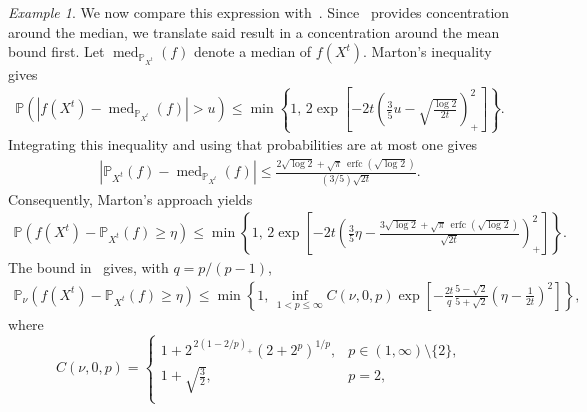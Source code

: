 \documentclass[11pt]{article}
\theoremstyle{plain}
\theoremstyle{remark}
\newtheorem{example}{Example}
\begin{document}
\begin{example}
We now compare this expression with~\cite{dependentViaMartingale, dependentViaStatAndChange, Marton1996BoundingB}. Since~\cite{Marton1996BoundingB} provides concentration around the median, we translate said result in a concentration around the mean bound first. 
Let
\(\operatorname{med}_{\mathbb P_{X^t}}(f)\) denote a median of
\(f(X^t)\). Marton's inequality gives
\begin{align}
\mathbb P\left(
    \left|
        f(X^t)
        -
        \operatorname{med}_{\mathbb P_{X^t}}(f)
    \right|>u
\right) \leq
\min\left\{
    1,\,
    2\exp\left[
        -2t\left(
            \frac35u-\sqrt{\frac{\log 2}{2t}}
        \right)_+^2
    \right]
\right\}.
\label{eq:nonStationaryTimeDependentMartonMedian}
\end{align}
Integrating this inequality and using that probabilities are at most
one gives
\begin{align}
\left|
    \mathbb P_{X^t}(f)
    -
    \operatorname{med}_{\mathbb P_{X^t}}(f)
\right|
\leq
\frac{
    2\sqrt{\log 2}
    +
    \sqrt{\pi}\,
    \operatorname{erfc}\!\left(\sqrt{\log 2}\right)
}{
    (3/5)\sqrt{2t}
}.
\label{eq:nonStationaryTimeDependentMartonMeanMedian}
\end{align}
Consequently, Marton's approach yields
\begin{align}
\mathbb P\left(
    f(X^t)-\mathbb P_{X^t}(f)\geq\eta
\right) \leq
\min\left\{
    1,\,
    2\exp\left[
        -2t\left(
            \frac35\eta
            -
            \frac{
                3\sqrt{\log 2}
                +
                \sqrt{\pi}\,
                \operatorname{erfc}\!\left(\sqrt{\log 2}\right)
            }{\sqrt{2t}}
        \right)_+^2
    \right]
\right\}.
\label{eq:nonStationaryTimeDependentMartonMean}
\end{align}
The bound in~\cite{dependentViaStatAndChange} gives, with
\(q=p/(p-1)\),
\begin{align}
\mathbb P_\nu\left(
    f(X^t)-\mathbb P_{X^t}(f)\geq\eta
\right) \leq
\min\left\{
    1,\,
    \inf_{1<p\leq\infty}
    C(\nu,0,p)
    \exp\left[
        -\frac{2t}{q}
        \frac{5-\sqrt2}{5+\sqrt2}
        \left(\eta-\frac1{2t}\right)^2
    \right]
\right\},
\label{eq:nonStationaryTimeDependentFanBound}
\end{align}
where
\[
C(\nu,0,p)=
\begin{cases}
\displaystyle
1+2^{\,2(1-2/p)_+}(2+2^p)^{1/p},
& p\in(1,\infty)\setminus\{2\},\\[0.6em]
\displaystyle 1+\sqrt{\frac32},
& p=2,\\[0.6em]

\end{cases}\]
\end{example}
\end{document}
